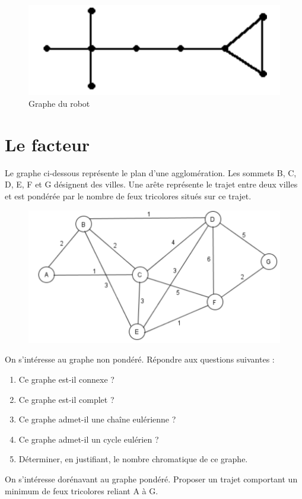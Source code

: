 \documentclass{article}[12pt]
\begin{document}
\begin{figure}[h!]
    \centering
    \includegraphics{Robot.png}
    \caption{Graphe du robot}
    \label{fig:robot}
\end{figure}

\section{Le facteur}
 Le graphe ci-dessous représente le plan d'une agglomération. Les sommets B, C, D, E, F et G désignent des villes. Une arête représente le trajet entre deux villes et est pondérée par le nombre de feux tricolores situés sur ce trajet. \\

\begin{figure}[h!]
    \centering
    \includegraphics[scale=0.6]{Djisktra.png}
    \label{fig:my_label}
\end{figure}

 On s'intéresse au graphe non pondéré. Répondre aux questions suivantes :
\begin{enumerate}
    \item Ce graphe est-il connexe ?
    \item Ce graphe est-il complet ?
    \item Ce graphe admet-il une chaîne eulérienne ?
    \item Ce graphe admet-il un cycle eulérien ?
    \item Déterminer, en justifiant, le nombre chromatique de ce graphe.
\end{enumerate}
On s'intéresse dorénavant au graphe pondéré. Proposer un trajet comportant un minimum de feux tricolores reliant A à G.
\end{document}
